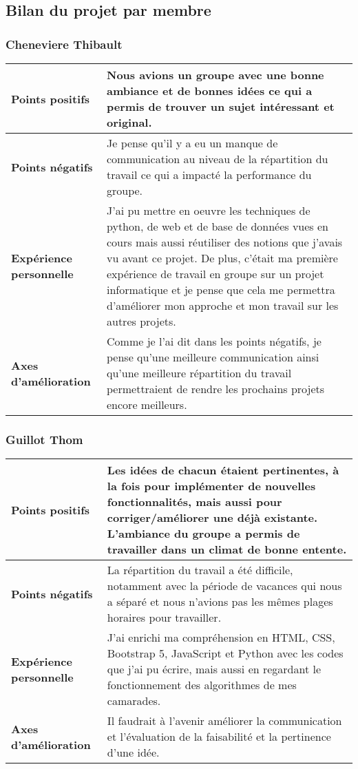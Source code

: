 \subsection{Bilan du projet par membre}
\vskip 0.25cm
\subsubsection{Cheneviere Thibault}
\noindent
\begin{tabularx}{\textwidth}{|X|X|}
    \hline
    \textbf{Points positifs} & {Nous avions un groupe avec une bonne ambiance et de bonnes idées ce qui a permis de trouver un sujet intéressant et original.} \\
    \hline
    \textbf{Points négatifs} & {Je pense qu'il y a eu un manque de communication au niveau de la répartition du travail ce qui a impacté la performance du groupe.} \\
    \hline
    \textbf{Expérience personnelle} & {J'ai pu mettre en oeuvre les techniques de python, de web et de base de données vues en cours mais aussi réutiliser des notions que j'avais vu avant ce projet. De plus, c'était ma première expérience de travail en groupe sur un projet informatique et je pense que cela me permettra d'améliorer mon approche et mon travail sur les autres projets.} \\
    \hline
    \textbf{Axes d'amélioration} & {Comme je l'ai dit dans les points négatifs, je pense qu'une meilleure communication ainsi qu'une meilleure répartition du travail permettraient de rendre les prochains projets encore meilleurs.} \\
    \hline
\end{tabularx}
\subsubsection{Guillot Thom}
\noindent
\begin{tabularx}{\textwidth}{|X|X|}
    \hline
    \textbf{Points positifs} & Les idées de chacun étaient pertinentes, à la fois pour implémenter de nouvelles fonctionnalités, mais aussi pour corriger/améliorer une déjà existante. L'ambiance du groupe a permis de travailler dans un climat de bonne entente.\\
    \hline
    \textbf{Points négatifs} & La répartition du travail a été difficile, notamment avec la période de vacances qui nous a séparé et nous n'avions pas les mêmes plages horaires pour travailler.\\
    \hline
    \textbf{Expérience personnelle} & J'ai enrichi ma compréhension en HTML, CSS, Bootstrap 5, JavaScript et Python avec les codes que j'ai pu écrire, mais aussi en regardant le fonctionnement des algorithmes de mes camarades.\\
    \hline
    \textbf{Axes d'amélioration} & Il faudrait à l'avenir améliorer la communication et l'évaluation de la faisabilité et la pertinence d'une idée.\\
    \hline
\end{tabularx}
